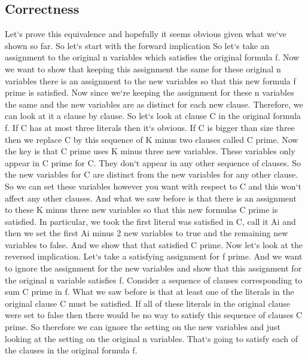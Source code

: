 \subsection{Correctness}
Let`s prove this equivalence and hopefully it seems obvious given what we`ve shown so far.
So let`s start with the forward implication So let`s take an assignment to the original n variables which satisfies the original formula f.
Now we want to show that keeping this assignment the same for these original n variables there is an assignment to the new variables so that this new formula f prime is satisfied.
Now since we`re keeping the assignment for these n variables the same and the new variables are as distinct for each new clause.
Therefore, we can look at it a clause by clause.
So let`s look at clause C in the original formula f.
If C has at most three literals then it`s obvious.
If C is bigger than size three then we replace C by this sequence of K minus two clauses called C prime.
Now the key is that C prime uses K minus three new variables.
These variables only appear in C prime for C\@.
They don`t appear in any other sequence of clauses.
So the new variables for C are distinct from the new variables for any other clause.
So we can set these variables however you want with respect to C and this won`t affect any other clauses.
And what we saw before is that there is an assignment to these K minus three new variables so that this new formulas C prime is satisfied.
In particular, we took the first literal was satisfied in C, call it Ai and then we set the first Ai minus 2 new variables to true and the remaining new variables to false.
And we show that that satisfied C prime.
Now let`s look at the reversed implication.
Let`s take a satisfying assignment for f prime.
And we want to ignore the assignment for the new variables and show that this assignment for the original n variable satisfies f.
Consider a sequence of clauses corresponding to sum C prime in f.
What we saw before is that at least one of the literals in the original clause C must be satisfied.
If all of these literals in the original clause were set to false then there would be no way to satisfy this sequence of clauses C prime.
So therefore we can ignore the setting on the new variables and just looking at the setting on the original n variables.
That`s going to satisfy each of the clauses in the original formula f.

